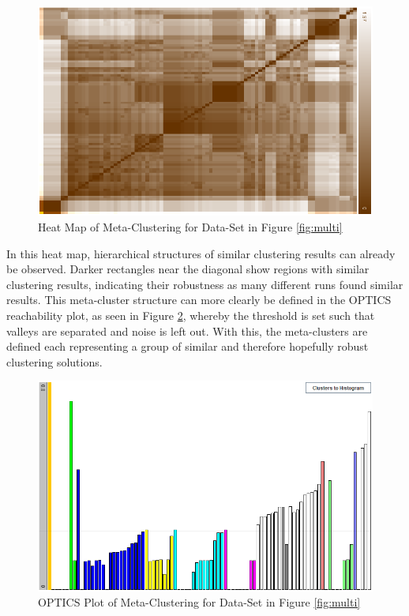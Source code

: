 \documentclass[
	a4paper,
	english,
	twoside,
	openright,               
	11pt                            
	]{report}
\begin{document}
\begin{figure}[h]
	\centering
	\includegraphics[scale=.4]{multi_heatmap}
	\caption{Heat Map of Meta-Clustering for Data-Set in Figure \ref{fig:multi}}
	\label{fig:multi_heatmap}
\end{figure}

In this heat map, hierarchical structures of similar clustering results can already be observed. Darker rectangles near the diagonal show regions with similar clustering results, indicating their robustness as many different runs found similar results. This meta-cluster structure can more clearly be defined in the OPTICS reachability plot, as seen in Figure \ref{fig:multi_optics}, whereby the threshold is set such that valleys are separated and noise is left out. With this, the meta-clusters are defined each representing a group of similar and therefore hopefully robust clustering solutions.

\begin{figure}[h]
	\centering
	\includegraphics[scale=.4]{multi_optics}
	\caption{OPTICS Plot of Meta-Clustering for Data-Set in Figure \ref{fig:multi}}
	\label{fig:multi_optics}
\end{figure}
\end{document}
